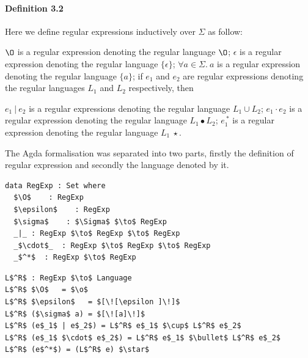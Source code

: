 \documentclass[twoside,openright,final]{bhamthesis}
\renewcommand{\item}{\itemindent0.5cm\itemold}
\begin{document}
\paragraph{Definition 3.2} Here we define regular expressions
inductively over \(\Sigma\) as follow: 
\begin{enumerate}[nolistsep]
  \item \(\O\) is a regular expression denoting the regular language \(\O\);
  \item \(\epsilon\) is a regular expression denoting the regular language \(\{\epsilon\}\);
  \item \(\forall a\in\Sigma.\ a\) is a regular expression denoting the regular language \(\{a\}\);
  \item if \(e_{1}\) and \(e_{2}\) are regular expressions denoting the regular
    languages \(L_1\) and \(L_2\) respectively, then
    \begin{enumerate}[nolistsep]
      \item \(e_{1}\ |\ e_{2}\) is a regular expressions denoting the
        regular language \(L_1 \cup L_2\);
      \item \(e_{1}\cdot e_{2}\) is a regular expression denoting the
        regular language \(L_1\bullet L_2\);
      \item \(e_{1}^{\ *}\) is a regular expression denoting the regular
        language \(L_1\ \star\).
     \end{enumerate}
\end{enumerate}
\vspace{1pc}
\par The Agda formalisation was separated into two parts, firstly the
definition of regular expression and secondly the language denoted by
it.

\begin{lstlisting}[caption=Regular Expression,mathescape=true]
data RegExp : Set where
  $\O$    : RegExp
  $\epsilon$    : RegExp
  $\sigma$    : $\Sigma$ $\to$ RegExp
  _|_ : RegExp $\to$ RegExp $\to$ RegExp
  _$\cdot$_  : RegExp $\to$ RegExp $\to$ RegExp
  _$^*$  : RegExp $\to$ RegExp
\end{lstlisting} 

\begin{lstlisting}[caption=Language denoted by a regular expression,mathescape=true]
L$^R$ : RegExp $\to$ Language
L$^R$ $\O$   = $\o$
L$^R$ $\epsilon$   = $[\![\epsilon ]\!]$
L$^R$ ($\sigma$ a) = $[\![a]\!]$
L$^R$ (e$_1$ | e$_2$) = L$^R$ e$_1$ $\cup$ L$^R$ e$_2$
L$^R$ (e$_1$ $\cdot$ e$_2$) = L$^R$ e$_1$ $\bullet$ L$^R$ e$_2$
L$^R$ (e$^*$) = (L$^R$ e) $\star$
\end{lstlisting}
\end{document}
